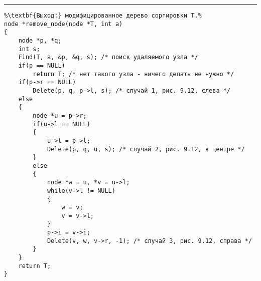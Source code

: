 \documentclass{article}
\begin{document}
\vspace{5pt} \hrule
\begin{lstlisting}[caption={Удаление узла из дерева сортировки}, label=p319, escapechar=\%]
%\noindent\textbf{Вход:} дерево сортировки T, заданное указателем на корень; ключ a: key.\\%
%\textbf{Выход:} модифицированное дерево сортировки T.%
node *remove_node(node *T, int a)
{
	node *p, *q;
	int s;
	Find(T, a, &p, &q, s); /* поиск удаляемого узла */
	if(p == NULL)
		return T; /* нет такого узла - ничего делать не нужно */
	if(p->r == NULL)
		Delete(p, q, p->l, s); /* случай 1, рис. 9.12, слева */
	else
	{
		node *u = p->r;
		if(u->l == NULL)
		{
			u->l = p->l;
			Delete(p, q, u, s); /* случай 2, рис. 9.12, в центре */
		}
		else
		{
			node *w = u, *v = u->l;
			while(v->l != NULL)
			{
				w = v;
				v = v->l;
			}
			p->i = v->i;
			Delete(v, w, v->r, -1); /* случай 3, рис. 9.12, справа */
		}
	}
	return T;
}
\end{lstlisting}
\end{document}
